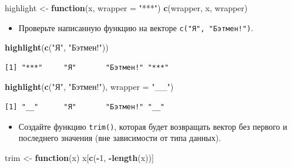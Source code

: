 \documentclass[
]{book}
\newenvironment{Shaded}{\begin{snugshade}}{\end{snugshade}}
\newcommand{\ControlFlowTok}[1]{\textcolor[rgb]{0.13,0.29,0.53}{\textbf{#1}}}
\newcommand{\DataTypeTok}[1]{\textcolor[rgb]{0.13,0.29,0.53}{#1}}
\newcommand{\DecValTok}[1]{\textcolor[rgb]{0.00,0.00,0.81}{#1}}
\newcommand{\KeywordTok}[1]{\textcolor[rgb]{0.13,0.29,0.53}{\textbf{#1}}}
\newcommand{\NormalTok}[1]{#1}
\newcommand{\OperatorTok}[1]{\textcolor[rgb]{0.81,0.36,0.00}{\textbf{#1}}}
\newcommand{\StringTok}[1]{\textcolor[rgb]{0.31,0.60,0.02}{#1}}
\providecommand{\tightlist}{%
  \setlength{\itemsep}{0pt}\setlength{\parskip}{0pt}}
\begin{document}
\begin{Shaded}
\begin{Highlighting}[]
\NormalTok{highlight <-}\StringTok{ }\ControlFlowTok{function}\NormalTok{(x, }\DataTypeTok{wrapper =} \StringTok{"***"}\NormalTok{) }\KeywordTok{c}\NormalTok{(wrapper, x, wrapper)}
\end{Highlighting}
\end{Shaded}

\begin{itemize}
\tightlist
\item
  Проверьте написанную функцию на векторе \texttt{c("Я",\ "Бэтмен!")}.
\end{itemize}

\begin{Shaded}
\begin{Highlighting}[]
\KeywordTok{highlight}\NormalTok{(}\KeywordTok{c}\NormalTok{(}\StringTok{"Я"}\NormalTok{, }\StringTok{"Бэтмен!"}\NormalTok{)) }
\end{Highlighting}
\end{Shaded}

\begin{verbatim}
[1] "***"     "Я"       "Бэтмен!" "***"    
\end{verbatim}

\begin{Shaded}
\begin{Highlighting}[]
\KeywordTok{highlight}\NormalTok{(}\KeywordTok{c}\NormalTok{(}\StringTok{"Я"}\NormalTok{, }\StringTok{"Бэтмен!"}\NormalTok{), }\DataTypeTok{wrapper =} \StringTok{"__"}\NormalTok{) }
\end{Highlighting}
\end{Shaded}

\begin{verbatim}
[1] "__"      "Я"       "Бэтмен!" "__"     
\end{verbatim}

\begin{itemize}
\tightlist
\item
  Создайте функцию \texttt{trim()}, которая будет возвращать вектор без первого и последнего значения (вне зависимости от типа данных).
\end{itemize}

\begin{Shaded}
\begin{Highlighting}[]
\NormalTok{trim <-}\StringTok{ }\ControlFlowTok{function}\NormalTok{(x) x[}\KeywordTok{c}\NormalTok{(}\OperatorTok{-}\DecValTok{1}\NormalTok{, }\OperatorTok{-}\KeywordTok{length}\NormalTok{(x))]}
\end{Highlighting}
\end{Shaded}
\end{document}
